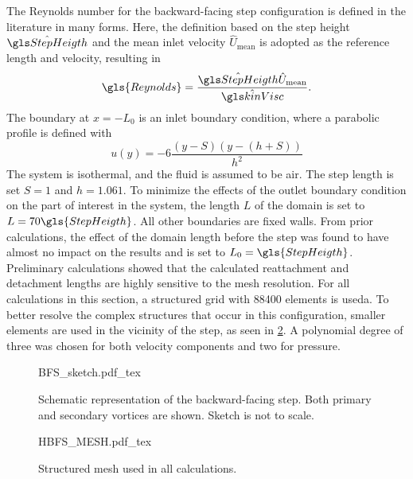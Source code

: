 The Reynolds number for the backward-facing step configuration is defined in the literature in many forms. Here, the definition based on the step height $\glsHat{StepHeigth}$ and the mean inlet velocity $\hat U_{\text{mean}}$ is adopted as the reference length and velocity, resulting in
\begin{equation}
	\gls{Reynolds}= \frac{\glsHat{StepHeigth}\hat U_{\text{mean}}}{\glsHat{kinVisc}}.
\end{equation}
The boundary at $x = - L_0$ is an inlet boundary condition, where a parabolic profile is defined with %
\begin{equation}
	u(y) = -6\frac{( y- S)( y-( h+ S))}{h^2} %
\end{equation}
The system is isothermal, and the fluid is assumed to be air. The step length is set $S=1$ and $h = 1.061$. To minimize the effects of the outlet boundary condition on the part of interest in the system, the length $L$ of the domain is set to $L = 70 \gls{StepHeigth}$. All other boundaries are fixed walls. From prior calculations, the effect of the domain length before the step was found to have almost no impact on the results and is set to $L_0 = \gls{StepHeigth}$. Preliminary calculations showed that the calculated reattachment and detachment lengths are highly sensitive to the mesh resolution. For all calculations in this section, a structured grid with 88400 elements is useda. To better resolve the complex structures that occur in this configuration, smaller elements are used in the vicinity of the step, as seen in \cref{bfsmesh}.  A polynomial degree of three was chosen for both velocity components and two for pressure.


\begin{figure}[tb]
	\begin{center}
		\def\svgwidth{0.9\textwidth}
		{BFS_sketch.pdf_tex}
		\caption{Schematic representation of the backward-facing step. Both primary and secondary vortices are shown. Sketch is not to scale.}
		\label{BFSsketch}
	\end{center}
\end{figure}

\begin{figure}[tb]
	\begin{center}
		\def\svgwidth{0.8\textwidth}
		{HBFS_MESH.pdf_tex}
		\caption{Structured mesh used in all calculations. }
		\label{bfsmesh}
	\end{center}
\end{figure}

